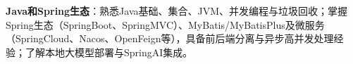 \item \textbf{Java和Spring生态}：熟悉Java基础、集合、JVM、并发编程与垃圾回收；掌握Spring生态（SpringBoot、SpringMVC）、MyBatis/MyBatisPlus及微服务（SpringCloud、Nacos、OpenFeign等），具备前后端分离与异步高并发处理经验；了解本地大模型部署与SpringAI集成。